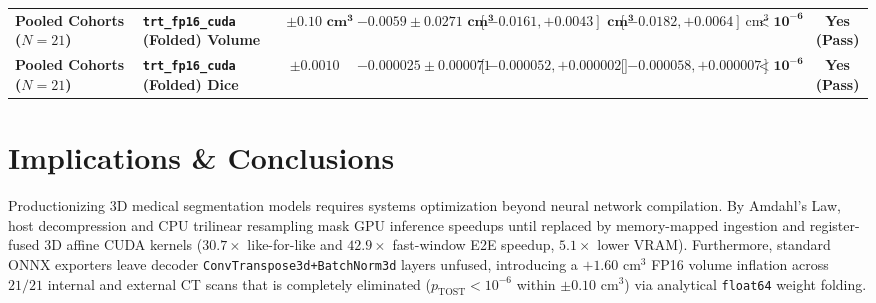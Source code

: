 \documentclass[10pt,twocolumn]{article}
\begin{document}
\begin{table}[t]
{\begin{tabular}{llcccccc}
\textbf{Pooled Cohorts ($N = 21$)} & \textbf{\texttt{trt\_fp16\_cuda} (Folded) Volume} & $\mathbf{\pm 0.10\textbf{ cm}^3}$ & $\mathbf{-0.0059 \pm 0.0271\textbf{ cm}^3}$ & $\mathbf{[-0.0161, +0.0043]\textbf{ cm}^3}$ & $[-0.0182, +0.0064]\text{ cm}^3$ & $\mathbf{< 10^{-6}}$ & \textbf{Yes (Pass)} \\
\textbf{Pooled Cohorts ($N = 21$)} & \textbf{\texttt{trt\_fp16\_cuda} (Folded) Dice} & $\mathbf{\pm 0.0010}$ & $\mathbf{-0.000025 \pm 0.000071}$ & $\mathbf{[-0.000052, +0.000002]}$ & $[-0.000058, +0.000007]$ & $\mathbf{< 10^{-6}}$ & \textbf{Yes (Pass)} \\
\bottomrule
\end{tabular}%
}
\end{table}

\section{Implications \& Conclusions}
Productionizing 3D medical segmentation models requires systems optimization beyond neural network compilation. By Amdahl's Law, host decompression and CPU trilinear resampling mask GPU inference speedups until replaced by memory-mapped ingestion and register-fused 3D affine CUDA kernels ($30.7\times$ like-for-like and $42.9\times$ fast-window E2E speedup, $5.1\times$ lower VRAM). Furthermore, standard ONNX exporters leave decoder \texttt{ConvTranspose3d+BatchNorm3d} layers unfused, introducing a $+1.60\text{ cm}^3$ FP16 volume inflation across $21/21$ internal and external CT scans that is completely eliminated ($p_{\text{TOST}} < 10^{-6}$ within $\pm 0.10\text{ cm}^3$) via analytical \texttt{float64} weight folding.
\end{document}
